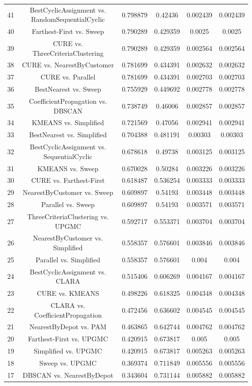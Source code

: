 \documentclass[a4paper,10pt]{article}
\begin{document}
\begin{landscape}
\begin{table}[!htp]
\begin{tabular}{cccccc}
41&BestCyclicAssignment vs. RandomSequentialCyclic&0.798879&0.42436&0.002439&0.002439\\
40&Farthest-First vs. Sweep&0.790289&0.429359&0.0025&0.0025\\
39&CURE vs. ThreeCriteriaClustering&0.790289&0.429359&0.002564&0.002564\\
38&CURE vs. NearestByCustomer&0.781699&0.434391&0.002632&0.002632\\
37&CURE vs. Parallel&0.781699&0.434391&0.002703&0.002703\\
36&BestNearest vs. Sweep&0.755929&0.449692&0.002778&0.002778\\
35&CoefficientPropagation vs. DBSCAN&0.738749&0.46006&0.002857&0.002857\\
34&KMEANS vs. Simplified&0.721569&0.47056&0.002941&0.002941\\
33&BestNearest vs. Simplified&0.704388&0.481191&0.00303&0.00303\\
32&BestCyclicAssignment vs. SequentialCyclic&0.678618&0.49738&0.003125&0.003125\\
31&KMEANS vs. Sweep&0.670028&0.50284&0.003226&0.003226\\
30&CURE vs. Farthest-First&0.618487&0.536254&0.003333&0.003333\\
29&NearestByCustomer vs. Sweep&0.609897&0.54193&0.003448&0.003448\\
28&Parallel vs. Sweep&0.609897&0.54193&0.003571&0.003571\\
27&ThreeCriteriaClustering vs. UPGMC&0.592717&0.553371&0.003704&0.003704\\
26&NearestByCustomer vs. Simplified&0.558357&0.576601&0.003846&0.003846\\
25&Parallel vs. Simplified&0.558357&0.576601&0.004&0.004\\
24&BestCyclicAssignment vs. CLARA&0.515406&0.606269&0.004167&0.004167\\
23&CURE vs. KMEANS&0.498226&0.618325&0.004348&0.004348\\
22&CLARA vs. CoefficientPropagation&0.472456&0.636602&0.004545&0.004545\\
21&NearestByDepot vs. PAM&0.463865&0.642744&0.004762&0.004762\\
20&Farthest-First vs. UPGMC&0.420915&0.673817&0.005&0.005\\
19&Simplified vs. UPGMC&0.420915&0.673817&0.005263&0.005263\\
18&Sweep vs. UPGMC&0.369374&0.711849&0.005556&0.005556\\
17&DBSCAN vs. NearestByDepot&0.343604&0.731144&0.005882&0.005882\\

\end{tabular}
\end{table}
\end{landscape}
\end{document}
